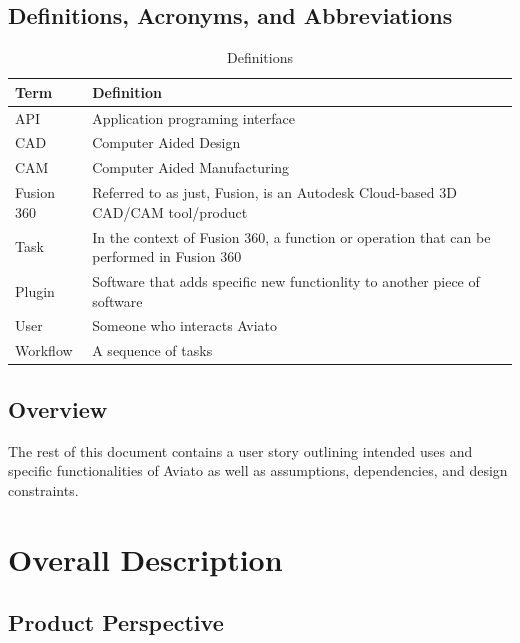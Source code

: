 \documentclass[onecolumn, draftclsnofoot,10pt, compsoc]{IEEEtran}
\def \botname{Aviato }
\begin{document}
    \subsection{Definitions, Acronyms, and Abbreviations}
        \begin{table}[h]
            \centering
            \caption{Definitions}
            \label{my-label}
            \begin{tabular}{|l|l|}
                \hline
                \textbf{Term} & \textbf{Definition} \\ \hline
                API & Application programing interface \\ \hline
                CAD & Computer Aided Design \\ \hline
                CAM & Computer Aided Manufacturing \\ \hline
                Fusion 360 & 
                Referred to as just, Fusion, is an Autodesk Cloud-based 3D CAD/CAM tool/product \\ \hline
                Task & In the context of Fusion 360, a function or operation that can be performed in Fusion 360 \\ \hline
                Plugin & Software that adds specific new functionlity to another piece of software \\ \hline
                User & Someone who interacts \botname  \\ \hline
                Workflow & A sequence of tasks \\ \hline
            \end{tabular}
        \end{table}
    \subsection{Overview}
        The rest of this document contains a user story outlining intended uses and specific functionalities of \botname as well as assumptions, dependencies, and design constraints. 

\section{Overall Description}
    \subsection{Product Perspective}
\end{document}
